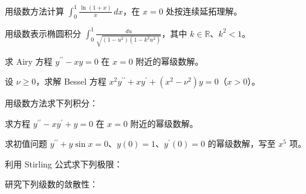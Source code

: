 \newpage
\noindent\begin{minipage}{\textwidth}
用级数方法计算 $\displaystyle\int_0^1\frac{\ln(1+x)}x\,dx$，在 $x=0$ 处按连续延拓理解。
\end{minipage}\par\vfill
\noindent\begin{minipage}{\textwidth}
用级数表示椭圆积分 $\displaystyle\int_0^1\frac{du}{\sqrt{(1-u^2)(1-k^2u^2)}}$，其中 $k\in\mathbb R$、$k^2<1$。
\end{minipage}\par\vfill
\noindent\begin{minipage}{\textwidth}
求 Airy 方程 $y^{\prime\prime}-xy=0$ 在 $x=0$ 附近的幂级数解。
\end{minipage}\par\vfill
\noindent\begin{minipage}{\textwidth}
设 $\nu\ge0$，求解 Bessel 方程 $x^2y^{\prime\prime}+xy^{\prime}+(x^2-\nu^2)y=0$（$x>0$）。
\end{minipage}\par\vfill
\newpage
\noindent\begin{minipage}{\textwidth}
用级数方法求下列积分：
\end{minipage}\par\vfill
\noindent\begin{minipage}{\textwidth}
求方程 $y^{\prime\prime}-xy^{\prime}+y=0$ 在 $x=0$ 附近的幂级数解。
\end{minipage}\par\vfill
\noindent\begin{minipage}{\textwidth}
求初值问题 $y^{\prime\prime}+y\sin x=0$、$y(0)=1$、$y^{\prime}(0)=0$ 的幂级数解，写至 $x^5$ 项。
\end{minipage}\par\vfill
\noindent\begin{minipage}{\textwidth}
利用 Stirling 公式求下列极限：
\end{minipage}\par\vfill
\newpage
\noindent\begin{minipage}{\textwidth}
研究下列级数的敛散性：
\end{minipage}\par\vfill
